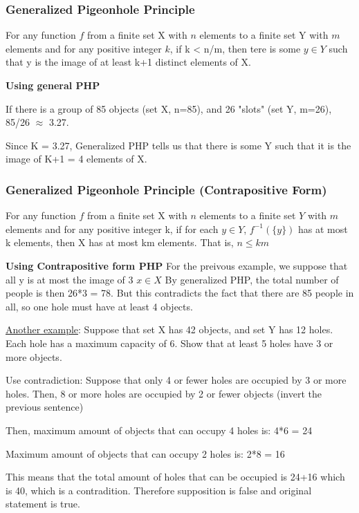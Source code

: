 \documentclass{article}
\newcommand{\sub}[1]{\vspace{10pt}\textbf{#1}}
\newcommand{\sbreak}{\vspace{10pt}}
\begin{document}
\subsubsection{Generalized Pigeonhole Principle}

For any function $f$ from a finite set X with $n$ elements to a finite set Y with $m$ elements and for any positive integer $k$, if k < n/m, then tere is some $y \in Y$ such that y is the image of at least k+1 distinct elements of X.

\sub{Using general PHP}

If there is a group of 85 objects (set X, n=85), and 26 "slots" (set Y, m=26), 85/26 $\approx$ 3.27.

Since K = 3.27, Generalized PHP tells us that there is some Y such that it is the image of K+1 = 4 elements of X.

\subsubsection{Generalized Pigeonhole Principle (Contrapositive Form)}
For any function $f$ from a finite set X with $n$ elements to a finite set $Y$ with $m$ elements and for any positive integer k, if for each $y\in Y$, $f^{-1}(\{y\})$ has at most k elements, then X has at most km elements. That is, $n \leq km$

\sub{Using Contrapositive form PHP}
For the preivous example, we suppose that all y is at most the image of 3 $x \in X$ By generalized PHP, the total number of people is then 26*3 = 78. But this contradicts the fact that there are 85 people in all, so one hole must have at least 4 objects.

\sbreak

\underline{Another example}: Suppose that set X has 42 objects, and set Y has 12 holes. Each hole has a maximum capacity of 6. Show that at least 5 holes have 3 or more objects.

\sbreak 

Use contradiction: Suppose that only 4 or fewer holes are occupied by 3 or more holes. Then, 8 or more holes are occupied by 2 or fewer objects (invert the previous sentence)

Then, maximum amount of objects that can occupy 4 holes is: 4*6 = 24

Maximum amount of objects that can occupy 2 holes is: 2*8 = 16

This means that the total amount of holes that can be occupied is 24+16 which is 40, which is a contradition. Therefore supposition is false and original statement is true.
\end{document}
